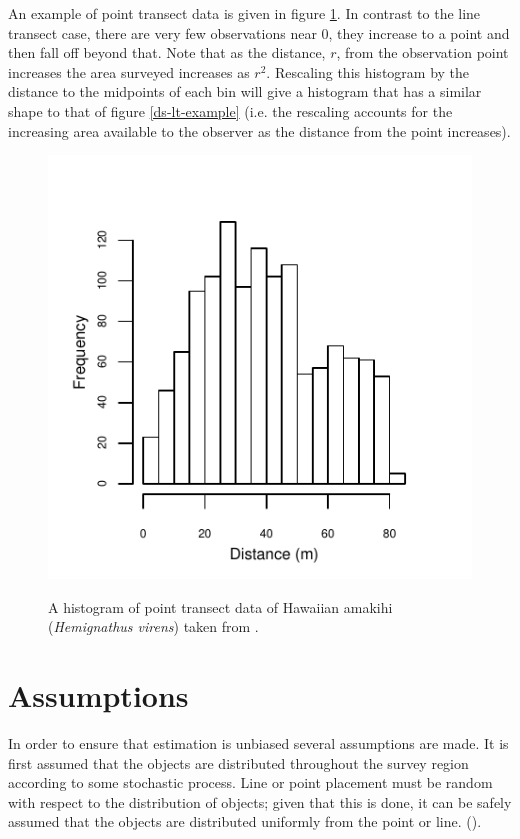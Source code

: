 An example of point transect data is given in figure \ref{ds-pt-example}. In contrast to the line transect case, there are very few observations near 0, they increase to a point and then fall off beyond that. Note that as the distance, $r$, from the observation point increases the area surveyed increases as $r^2$. Rescaling this histogram by the distance to the midpoints of each bin will give a histogram that has a similar shape to that of figure \ref{ds-lt-example} (i.e. the rescaling accounts for the increasing area available to the observer as the distance from the point increases).

\begin{figure}
\centering
\includegraphics{intro/figs/pt-data-example.pdf}\\
\caption{A histogram of point transect data of Hawaiian amakihi (\textit{Hemignathus virens}) taken from .}
\label{ds-pt-example}
\end{figure}


\section{Assumptions}
\label{ds-assumptions}
\label{cor-7s2}In order to ensure that estimation is unbiased several assumptions are made. It is first assumed that the objects are distributed throughout the survey region according to some stochastic process. Line or point placement must be random with respect to the distribution of objects; given that this is done, it can be safely assumed that the objects are distributed uniformly from the point or line. (\cite[p.  29]{IDS})\label{cor-7s12}. 

